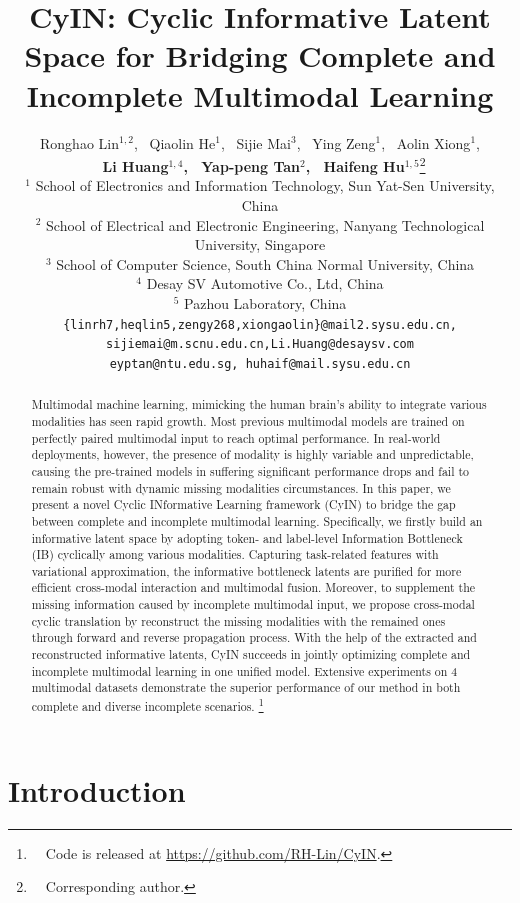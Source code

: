 \documentclass{article}
\title{CyIN: Cyclic Informative Latent Space for Bridging Complete and Incomplete Multimodal Learning}
\author{Ronghao Lin$^{1,2}$,
~Qiaolin He$^1$,
~Sijie Mai$^3$,
~Ying Zeng$^1$,
~Aolin Xiong$^1$, \\
\textbf{~Li Huang$^{1,4}$, 
~Yap-peng Tan$^2$,
~Haifeng Hu$^{1,5}$}\thanks{~~Corresponding author.} 
\vspace{3pt}\\
$^1$ School of Electronics and Information Technology, Sun Yat-Sen University, China\\
$^2$ School of Electrical and Electronic Engineering, Nanyang Technological University, Singapore \\
$^3$ School of Computer Science, South China Normal University, China \\
$^4$ Desay SV Automotive Co., Ltd, China \\
$^5$ Pazhou Laboratory, China
\vspace{3pt}\\  
\texttt{\{linrh7,heqlin5,zengy268,xiongaolin\}@mail2.sysu.edu.cn,} \\ %
\texttt{sijiemai@m.scnu.edu.cn,Li.Huang@desaysv.com}\\ 
\texttt{eyptan@ntu.edu.sg, huhaif@mail.sysu.edu.cn}
}
\begin{document}
\maketitle

\begin{abstract}
Multimodal machine learning, mimicking the human brain’s ability to integrate various modalities has seen rapid growth. Most previous multimodal models are trained on perfectly paired multimodal input to reach optimal performance. In real‑world deployments, however, the presence of modality is highly variable and unpredictable, causing the pre-trained models in suffering significant performance drops and fail to remain robust with dynamic missing modalities circumstances. In this paper, we present a novel Cyclic INformative Learning framework (CyIN) to bridge the gap between complete and incomplete multimodal learning. Specifically, we firstly build an informative latent space by adopting token- and label-level Information Bottleneck (IB) cyclically among various modalities. Capturing task-related features with variational approximation, the informative bottleneck latents are purified for more efficient cross-modal interaction and multimodal fusion. Moreover, to supplement the missing information caused by incomplete multimodal input, we propose cross-modal cyclic translation by reconstruct the missing modalities with the remained ones through forward and reverse propagation process. With the help of the extracted and reconstructed informative latents, CyIN succeeds in jointly optimizing complete and incomplete multimodal learning in one unified model. Extensive experiments on 4 multimodal datasets demonstrate the superior performance of our method in both complete and diverse incomplete scenarios. 
\footnote[1]{\ \ Code is released at \url{https://github.com/RH-Lin/CyIN}. }

\end{abstract}


\section{Introduction}
\end{document}
